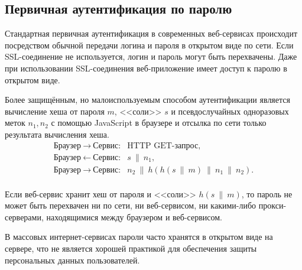 \subsection{Первичная аутентификация по паролю}

Стандартная первичная аутентификация в современных веб-сервисах происходит посредством обычной передачи логина и пароля в открытом виде по сети. Если SSL-соединение не используется, логин и пароль могут быть перехвачены. Даже при использовании SSL-соединения веб-приложение имеет доступ к паролю в открытом виде.

Более защищённым, но малоиспользуемым способом аутентификации является вычисление хеша от пароля $m$, <<соли>> $s$ и псевдослучайных одноразовых меток $n_1, n_2$ с помощью JavaScript в браузере и отсылка по сети только результата вычисления хеша.
\[ \begin{array}{ll}
    \text{Браузер} ~\rightarrow~ \text{Сервис:} & \text{HTTP GET-запрос,} \\
    \text{Браузер} ~\leftarrow~ \text{Сервис:}  & s ~\|~ n_1, \\
    \text{Браузер} ~\rightarrow~ \text{Сервис:} & n_2 ~\|~ h( h(s ~\|~ m) ~\|~ n_1 ~\|~ n_2). \\
\end{array} \]

Если веб-сервис хранит хеш от пароля и <<соли>> $h(s ~\|~ m)$, то пароль не может быть перехвачен ни по сети, ни веб-сервисом, ни какими-либо прокси-серверами, находящимися между браузером и веб-сервисом.

В массовых интернет-сервисах пароли часто хранятся в открытом виде на сервере, что не является хорошей практикой для обеспечения защиты персональных данных пользователей.




